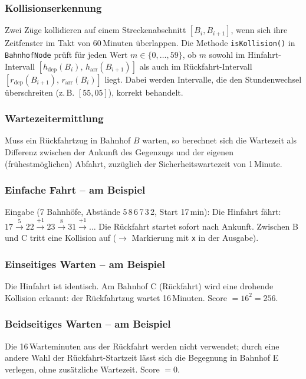 \documentclass[12pt,a4paper]{article}
\begin{document}
\subsubsection{Kollisionserkennung}
Zwei Züge kollidieren auf einem Streckenabschnitt $[B_i, B_{i+1}]$, wenn sich
ihre Zeitfenster im Takt von 60\,Minuten überlappen. Die Methode
\texttt{isKollision()} in \texttt{BahnhofNode} prüft für jeden Wert
$m \in \{0,\ldots,59\}$, ob $m$ sowohl im Hinfahrt-Intervall
$[h_{\text{dep}}(B_i),\, h_{\text{arr}}(B_{i+1})]$ als auch im
Rückfahrt-Intervall $[r_{\text{dep}}(B_{i+1}),\, r_{\text{arr}}(B_i)]$ liegt.
Dabei werden Intervalle, die den Stundenwechsel überschreiten (z.\,B.
$[55, 05]$), korrekt behandelt.

\subsubsection{Wartezeitermittlung}
Muss ein Rückfahrtzug in Bahnhof $B$ warten, so berechnet sich die Wartezeit als
Differenz zwischen der Ankunft des Gegenzugs und der eigenen (frühestmöglichen)
Abfahrt, zuzüglich der Sicherheitswartezeit von 1\,Minute.

\subsubsection{Einfache Fahrt -- am Beispiel}
Eingabe (7 Bahnhöfe, Abstände 5\,8\,6\,7\,3\,2, Start 17\,min):
Die Hinfahrt fährt: $17 \xrightarrow{5} 22 \xrightarrow{+1} 23 \xrightarrow{8}
31 \xrightarrow{+1} \ldots$
Die Rückfahrt startet sofort nach Ankunft. Zwischen B und C tritt eine Kollision
auf ($\to$ Markierung mit \texttt{x} in der Ausgabe).

\subsubsection{Einseitiges Warten -- am Beispiel}
Die Hinfahrt ist identisch. Am Bahnhof C (Rückfahrt) wird eine drohende Kollision
erkannt: der Rückfahrtzug wartet 16\,Minuten. Score $= 16^2 = 256$.

\subsubsection{Beidseitiges Warten -- am Beispiel}
Die 16\,Warteminuten aus der Rückfahrt werden nicht verwendet;
durch eine andere Wahl der Rückfahrt-Startzeit lässt sich die Begegnung
in Bahnhof E verlegen, ohne zusätzliche Wartezeit. Score $= 0$.
\end{document}
